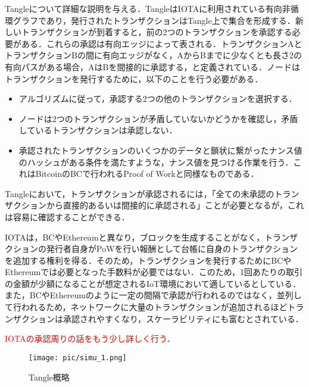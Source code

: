 \documentclass[japanese, macos]{KU2}
\begin{document}
Tangleについて詳細な説明を与える．TangleはIOTAに利用されている有向非循環グラフであり，発行されたトランザクションはTangle上で集合を形成する．新しいトランザクションが到着すると，前の2つのトランザクションを承認する必要がある．これらの承認は有向エッジによって表される．トランザクションAとトランザクションBの間に有向エッジがなく，AからBまでに少なくとも長さ2の有向パスがある場合，AはBを間接的に承認する，と定義されている．ノードはトランザクションを発行するために，以下のことを行う必要がある．
\begin{itemize}
\item アルゴリズムに従って，承認する2つの他のトランザクションを選択する．
\item ノードは2つのトランザクションが矛盾していないかどうかを確認し，矛盾しているトランザクションは承認しない．
\item 承認されたトランザクションのいくつかのデータと鎖状に繋がったナンス値のハッシュがある条件を満たすような，ナンス値を見つける作業を行う．これはBitcoinのBCで行われるProof of Workと同様なものである．
\end{itemize}
Tangleにおいて，トランザクションが承認されるには，「全ての未承認のトランザクションから直接的あるいは間接的に承認される」ことが必要となるが，これは容易に確認することができる．

IOTAは，BCやEthereumと異なり，ブロックを生成することがなく，トランザクションの発行者自身がPoWを行い報酬として台帳に自身のトランザクションを追加する権利を得る．そのため，トランザクションを発行するためにBCやEthereumでは必要となった手数料が必要ではない．このため，1回あたりの取引の金額が少額になることが想定されるIoT環境において適しているとしている．また，BCやEthereumのように一定の間隔で承認が行われるのではなく，並列して行われるため，ネットワークに大量のトランザクションが追加されるほどトランザクションは承認されやすくなり，スケーラビリティにも富むとされている．

\textcolor{red}{IOTAの承認周りの話をもう少し詳しく行う．}

\begin{figure}[htbp]
  \begin{center} 
    \texttt{[image: pic/simu\_1.png]}
    \caption{Tangle概略}
    \label{fig:tangle} 
  \end{center}
\end{figure}
\end{document}
